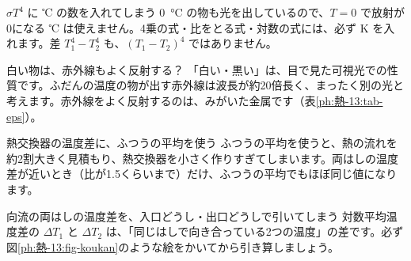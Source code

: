 \begin{tsumazuki}{$\sigma T^4$ に ℃ の数を入れてしまう}
\qty{0}{\celsius} の物も光を出しているので、$T=0$ で放射が0になる ℃ は使えません。4乗の式・比をとる式・対数の式には、必ず K を入れます。差 $T_1^4-T_2^4$ も、$(T_1-T_2)^4$ ではありません。
\end{tsumazuki}
\begin{tsumazuki}{白い物は、赤外線もよく反射する？}
「白い・黒い」は、目で見た可視光での性質です。ふだんの温度の物が出す赤外線は波長が約20倍長く、まったく別の光と考えます。赤外線をよく反射するのは、みがいた金属です（表\ref{ph:熱-13:tab-eps}）。
\end{tsumazuki}
\begin{tsumazuki}{熱交換器の温度差に、ふつうの平均を使う}
ふつうの平均を使うと、熱の流れを約2割大きく見積もり、熱交換器を小さく作りすぎてしまいます。両はしの温度差が近いとき（比が1.5くらいまで）だけ、ふつうの平均でもほぼ同じ値になります。
\end{tsumazuki}
\begin{tsumazuki}{向流の両はしの温度差を、入口どうし・出口どうしで引いてしまう}
対数平均温度差の $\Delta T_1$ と $\Delta T_2$ は、「同じはしで向き合っている2つの温度」の差です。必ず図\ref{ph:熱-13:fig-koukan}のような絵をかいてから引き算しましょう。
\end{tsumazuki}

